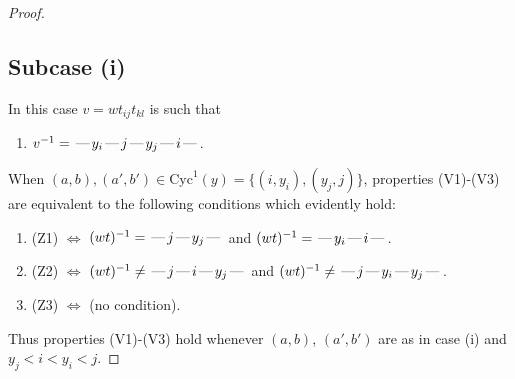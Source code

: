 \documentclass[10pt]{article}
\theoremstyle{definition}
\theoremstyle{definition}
\def\dash{\text{\hspace{0.5mm}---\hspace{0.5mm}}}
\def\Cyc{\mathrm{Cyc}}
\begin{document}
\begin{proof}
\subsection{Subcase (i)}
In this case $v = wt_{ij}t_{kl}$ is such that
\begin{enumerate}\item[]$v^{-1} = \dash y_i\dash j\dash y_j\dash i\dash $.\end{enumerate}
When $(a,b),(a',b')\in\Cyc^1(y)= \{(i,y_i),(y_j,j)\}$,
properties (V1)-(V3) are equivalent to the following conditions which evidently hold:
\begin{enumerate}
\item[](Z1) $\Leftrightarrow$ $(wt)^{-1} = \dash j \dash y_j \dash$  and $(wt)^{-1} = \dash y_i \dash i \dash$.
\item[](Z2) $\Leftrightarrow$ $(wt)^{-1} \neq \dash j \dash i \dash y_j \dash$ and $(wt)^{-1}\neq \dash j \dash y_i \dash y_j \dash$.
\item[](Z3) $\Leftrightarrow$ (no condition).
\end{enumerate}
Thus properties (V1)-(V3) hold whenever
$(a,b)$, $(a',b')$ are as in case (i) and $y_j < i < y_i < j$.

\end{proof}
\end{document}
